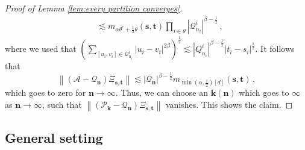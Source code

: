 \documentclass[11pt,oneside,english,reqno]{amsart}
\numberwithin{equation}{section}
\numberwithin{figure}{section}
\theoremstyle{plain}
\theoremstyle{definition}
\theoremstyle{remark}
\theoremstyle{plain}
\theoremstyle{plain}
\theoremstyle{plain}
\theoremstyle{plain}
\theoremstyle{plain}
\newcommand{\cA}{\mathcal{A}}
\newcommand{\cP}{\mathcal{P}}
\newcommand{\cQ}{\mathcal{Q}}
\newcommand{\bk}{\mathbf{k}}
\newcommand{\bn}{\mathbf{n}}
\newcommand{\bs}{\mathbf{s}}
\newcommand{\bt}{\mathbf{t}}
\newcommand{\norm}[1]{\left\lVert #1\right\rVert}
\newcommand{\abs}[1]{\left\lvert #1\right\rvert}
\begin{document}
\begin{proof}[Proof of Lemma \ref{lem:every partition converges}]
\begin{align*}
        &\lesssim m_{\alpha\theta^c+\frac 12\theta}(\bs,\bt)\prod_{i\in\theta}\abs{\cQ^i_{n_i}}^{\beta-\frac 12}\,,
    \end{align*}
%
    where we used that $\left(\sum_{[u_i,v_i]\in\cQ_{n_i}^i} \abs{u_i-v_i}^{2\beta}\right)^{\frac 12} \lesssim \abs{Q_{n_i}^i}^{\beta-\frac 12}\abs{t_i-s_i}^{\frac 12}$. It follows that
%
    \begin{equation*}
        \norm{(\cA-\cQ_\bn)\Xi_{\bs,\bt}}\lesssim \abs{\cQ_\bn}^{\beta-\frac 12}m_{\min(\alpha,\frac 12)[d]}(\bs,\bt)\,,
    \end{equation*}
%
    which goes to zero for $\bn\to\infty$. Thus, we can choose an $\bk(\bn)$ which goes to $\infty$ as $\bn\to\infty$, such that $\norm{(\cP_\bk-\cQ_\bn)\Xi_{\bs,\bt}}$ vanishes. This shows the claim.
\end{proof}

\subsection{General setting}\label{sec:general_sewing_lemma}
\end{document}
